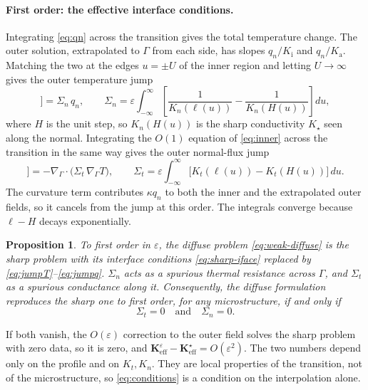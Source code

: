 \documentclass[11pt]{article}
\newtheorem{proposition}{Proposition}
\newcommand{\Gam}{\Gamma}
\newcommand{\Keff}{\mathbf{K}_{\mathrm{eff}}}
\newcommand{\Ka}{K_{\mathrm a}}
\newcommand{\Ki}{K_{\mathrm i}}
\newcommand{\Kt}{K_{t}}
\newcommand{\Kn}{K_{n}}
\newcommand{\jump}[1]{[\![\,#1\,]\!]}
\begin{document}
\paragraph{First order: the effective interface conditions.} Integrating
\eqref{eq:qn} across the transition gives the total temperature change. The
outer solution, extrapolated to $\Gam$ from each side, has slopes
$q_n/\Ki$ and $q_n/\Ka$. Matching the two at the edges $u=\pm U$ of the inner
region and letting $U\to\infty$ gives the outer temperature jump
\begin{equation}
\jump{T}=\Sigma_n\,q_n,\qquad
\Sigma_n=\varepsilon\int_{-\infty}^{\infty}\!\left[\frac{1}{\Kn(\ell(u))}-\frac{1}{\Kn(H(u))}\right]du ,
\label{eq:jumpT}
\end{equation}
where $H$ is the unit step, so $\Kn(H(u))$ is the sharp conductivity $K_\star$
seen along the normal. Integrating the $O(1)$ equation of \eqref{eq:inner}
across the transition in the same way gives the outer normal-flux jump
\begin{equation}
\jump{q_n}=-\nabla_\Gam\!\cdot\!\big(\Sigma_t\,\nabla_\Gam T\big),\qquad
\Sigma_t=\varepsilon\int_{-\infty}^{\infty}\!\big[\Kt(\ell(u))-\Kt(H(u))\big]\,du .
\label{eq:jumpq}
\end{equation}
The curvature term contributes $\kappa q_n$ to both the inner and the
extrapolated outer fields, so it cancels from the jump at this order. The
integrals converge because $\ell-H$ decays exponentially.

\begin{proposition}\label{prop:equiv}
To first order in $\varepsilon$, the diffuse problem \eqref{eq:weak-diffuse}
is the sharp problem with its interface conditions \eqref{eq:sharp-iface}
replaced by \eqref{eq:jumpT}--\eqref{eq:jumpq}. $\Sigma_n$ acts as a spurious
thermal resistance across $\Gam$, and $\Sigma_t$ as a spurious conductance along
it. Consequently, the diffuse formulation reproduces the sharp one to first
order, for any microstructure, if and only if
\begin{equation}
\Sigma_t=0\quad\text{and}\quad\Sigma_n=0 .
\label{eq:conditions}
\end{equation}
\end{proposition}

\noindent If both vanish, the $O(\varepsilon)$ correction to the outer field
solves the sharp problem with zero data, so it is zero, and
$\Keff^\varepsilon-\Keff^\star=O(\varepsilon^2)$. The two numbers depend only on
the profile and on $\Kt,\Kn$. They are local properties of the transition, not
of the microstructure, so \eqref{eq:conditions} is a condition on the
interpolation alone.
\end{document}
